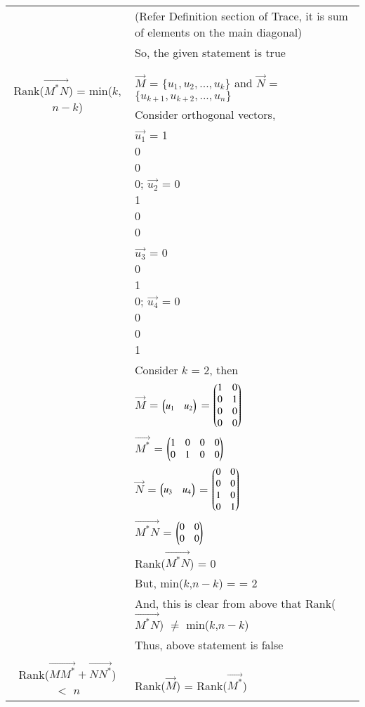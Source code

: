 \documentclass[journal,12pt]{IEEEtran}
\begin{document}
\begin{longtable}{|c|l|}
    & (Refer Definition section of Trace, it is sum of elements on the main diagonal)\\
    & So, the given statement is true \\
	& \\
	\hline
	\multirow{3}{*}{Rank($\vec{{M}^*N}$) = min($k$,$n-k$)} 
	& \\
	& $\vec{M}$ = $\{u_1,u_2,...,u_k\}$ and $\vec{N}$ = $\{u_{k+1},u_{k+2},...,u_n\}$ \\
	& Consider orthogonal vectors,\\
	& $\vec{u_1}$ = \myvec{1\\0\\0\\0}; $\vec{u_2}$ = \myvec{0\\1\\0\\0}\\
	& $\vec{u_3}$ = \myvec{0\\0\\1\\0}; $\vec{u_4}$ = \myvec{0\\0\\0\\1}\\
	& Consider $k$ = 2, then \\
	& $\vec{M}$ = $\begin{pmatrix}u_1&u_2\end{pmatrix}$ = $\begin{pmatrix}1&0\\0&1\\0&0\\0&0\end{pmatrix}$\\
	& $\vec{M^*}$ = $\begin{pmatrix}1&0&0&0\\0&1&0&0\end{pmatrix}$\\
	& $\vec{N}$ = $\begin{pmatrix}u_3&u_4\end{pmatrix}$ = $\begin{pmatrix}0&0\\0&0\\1&0\\0&1\end{pmatrix}$\\
	& $\vec{M^*N}$ = $\begin{pmatrix}0&0\\0&0\end{pmatrix}$\\
	& Rank($\vec{M^*N}$) = 0\\
	& But, min($k$,$n-k$) = \brak{2,2} = 2 \\
	& And, this is clear from above that Rank($\vec{{M}^*N}$) $\ne$ min($k$,$n-k$)\\
	& Thus, above statement is false \\
	&\\
	\hline
	\multirow{3}{*}{Rank($\vec{M{M}^*}+\vec{N{N}^*}$) $<$ $n$} 
	& \\
	& Rank($\vec{M}$) = Rank($\vec{M^*}$)\\

\end{longtable}
\end{document}
